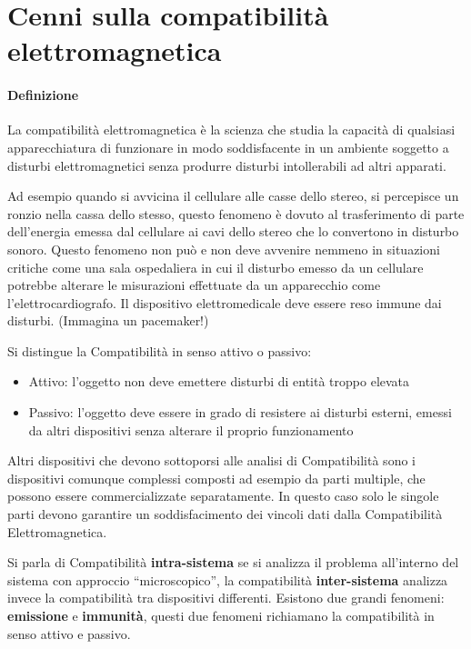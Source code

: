 \section{Cenni sulla compatibilità elettromagnetica}
\paragraph{Definizione}
La compatibilità elettromagnetica è la scienza che studia la capacità di qualsiasi 
apparecchiatura di funzionare in modo soddisfacente in un ambiente soggetto a disturbi elettromagnetici
senza produrre disturbi intollerabili ad altri apparati.

Ad esempio quando si avvicina il cellulare alle casse dello stereo, si percepisce un ronzio nella cassa
dello stesso, questo fenomeno è dovuto al trasferimento di parte dell'energia emessa dal cellulare ai cavi 
dello stereo che lo convertono in disturbo sonoro.
Questo fenomeno non può e non deve avvenire nemmeno in situazioni critiche come una sala ospedaliera in cui il disturbo
emesso da un cellulare potrebbe alterare le misurazioni effettuate da un apparecchio come l'elettrocardiografo.
Il dispositivo elettromedicale deve essere reso immune dai disturbi. (Immagina un pacemaker!)

Si distingue la Compatibilità in senso attivo o passivo:
\begin{itemize}
 \item Attivo: l'oggetto non deve emettere disturbi di entità troppo elevata
 \item Passivo: l'oggetto deve essere in grado di resistere ai disturbi esterni, emessi da altri dispositivi
 senza alterare il proprio funzionamento
\end{itemize}

Altri dispositivi che devono sottoporsi alle analisi di Compatibilità sono i dispositivi comunque complessi
composti ad esempio da parti multiple, che possono essere commercializzate separatamente. In questo caso solo
le singole parti devono garantire un soddisfacimento dei vincoli dati dalla Compatibilità Elettromagnetica.

Si parla di Compatibilità \textbf{intra-sistema} se si analizza il problema all'interno del sistema con approccio
``microscopico'', la compatibilità \textbf{inter-sistema} analizza invece la compatibilità tra dispositivi differenti.
Esistono due grandi fenomeni: \textbf{emissione} e \textbf{immunità}, questi due fenomeni richiamano la compatibilità in senso attivo e passivo.


